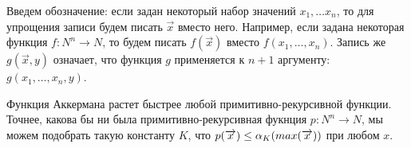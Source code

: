 Введем обозначение: если задан некоторый набор значений
$x_1, \dots x_n$, то для упрощения записи будем писать $\overrightarrow{x}$
вместо него. Например, если задана некоторая функция $f: N^n \rightarrow N$,
то будем писать $f(\overrightarrow{x})$ вместо $f(x_1,\dots,x_n)$.
Запись же $g(\overrightarrow{x},y)$ означает, что функция $g$ применяется к
$n+1$ аргументу: $g(x_1, \dots, x_n, y)$.

\begin{theorem}
Функция Аккермана растет быстрее любой примитивно-рекурсивной функции. Точнее,
какова бы ни была примитивно-рекурсивная фукнция $p: N^n \rightarrow N$, 
мы можем подобрать такую константу $K$, что 
$p(\overrightarrow{x}) \le \alpha_K(\\max(\overrightarrow{x}))$ 
при любом $x$. 
\end{theorem}

